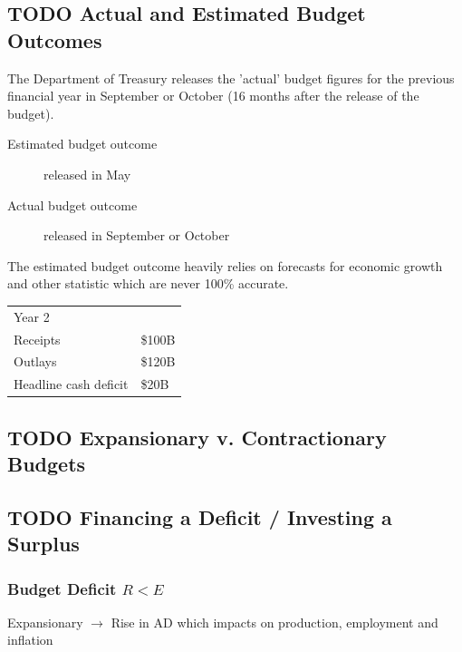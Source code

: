 \documentclass[11pt]{article}
\begin{document}
\subsection{{\bfseries\sffamily TODO} Actual and Estimated Budget Outcomes}
\label{sec-1-7}

The Department of Treasury releases the 'actual' budget figures for
the previous financial year in September or October (16 months after
the release of the budget).

\begin{description}
\item[{Estimated budget outcome}] released in May
\item[{Actual budget outcome}] released in September or October
\end{description}

The estimated budget outcome heavily relies on forecasts for economic
growth and other statistic which are never 100\% accurate.

\begin{center}
\begin{tabular}{ll}
Year 2 & \\
Receipts & \$100B\\
Outlays & \$120B\\
Headline cash deficit & \$20B\\
\end{tabular}
\end{center}






\subsection{{\bfseries\sffamily TODO} Expansionary v. Contractionary Budgets}
\label{sec-1-8}



\subsection{{\bfseries\sffamily TODO} Financing a Deficit / Investing a Surplus}
\label{sec-1-9}

\subsubsection{Budget Deficit $R < E$}
\label{sec-1-9-1}

Expansionary $\rightarrow$ Rise in AD which impacts on production,
employment and inflation
\end{document}
